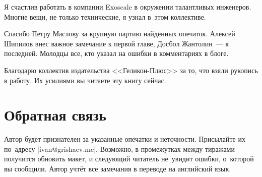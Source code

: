 Я счастлив работать в компании Exoscale в окружении талантливых
инженеров. Многие вещи, не только технические, я узнал в~этом коллективе.

Спасибо Петру Маслову за крупную партию найденных опечаток. Алексей Шипилов внес
важное замечание к первой главе, Досбол Жантолин~--- к последней. Молодцы все,
кто указал на ошибки в комментариях в блоге.

Благодарю коллектив издательства <<Геликон-Плюс>> за то, что взяли рукопись в
работу. Их усилиями вы читаете эту книгу сейчас.

\section*{Обратная связь}

Автор будет признателен за указанные опечатки и неточности. Присылайте их
по~адресу \spverb|ivan@grishaev.me|. Возможно, в промежутках между тиражами
получится обновить макет, и следующий читатель не~увидит ошибки, о~которой вы
сообщили. Автор учтёт все замечания в переводе на английский язык.
